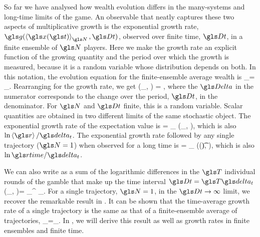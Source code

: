 
So far we have analysed how wealth evolution differs in the many-systems and long-time limits of the game. An observable that neatly captures these two aspects of multiplicative growth is the exponential growth rate, $\g(\ave{\x(\t)}_\N, \Dt)$, observed over finite time, $\Dt$, in a finite ensemble of $\N$ players. Here we make the growth rate an explicit function of the growing quantity and the period over which the growth is measured, because it is a random variable whose distribution depends on both. In this notation, the evolution equation for the finite-ensemble average wealth is
\be
\ave{\x(\t+\Dt)}_\N = \ave{\x(\t)}_\N \exp \left[ \g(\ave{\x(\t)}_\N, \Dt) \Dt \right].
\ee
Rearranging for the growth rate, we get
\be
\g(\ave{\x(\t)}_\N, \Dt) = \frac{\D \ln \ave{\x}_\N}{\Dt},
\ee
where the $\D$ in the numerator corresponds to the change over the period, $\Dt$, in the denominator. For $\N$ and $\Dt$ finite, this is a random variable. Scalar quantities are obtained in two different limits of the same stochastic object. The exponential growth rate of the expectation value is
\be
\ggave = \lim_{\N\to\infty} \g(\ave{\x(\t)}_\N, \Dt),
\ee
which is also $\ln \ave{\gr}/\dt$. The exponential growth rate followed by any single trajectory ($\N=1$) when observed for a long time is 
\be
\ggtime = \lim_{\Dt\to\infty} \g(\x(\t), \Dt),
\ee
which is also $\ln \grtime/\dt$.

We can also write  as a sum of the logarithmic differences in the $\T$ individual rounds of the gamble that make up the time interval $\Dt=\T \dt$
\be
\g(\ave{\x(\t)}_\N, \Dt)=  \sum_{}^{\T} \D\ln \ave{\x(\t+\gtau\dt)}_\N.
\ee
For a single trajectory, $\N=1$, in the $\Dt\to\infty$ limit, we recover the remarkable result in .
It can be shown \cite{PetersKlein2013} that the time-average growth rate of a single trajectory is the same as that of a finite-ensemble average of trajectories, \ie 
\be
\lim_{\Dt\to\infty}\frac{\D \ln \x}{\Dt}=\lim_{\Dt\to\infty}.
\ee
In , we will derive this result as well as growth rates in finite ensembles and finite time.

